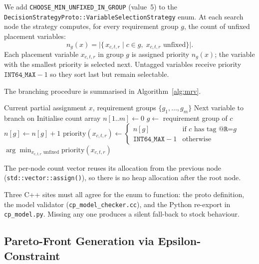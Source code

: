\documentclass[conference]{IEEEtran}
\begin{document}
We add \texttt{CHOOSE\_MIN\_UNFIXED\_IN\_GROUP} (value~5) to the
\texttt{DecisionStrategyProto::VariableSelectionStrategy} enum. At each
search node the strategy computes, for every requirement group $g$, the count
of unfixed placement variables:
\begin{equation}
  n_g(x) = \bigl|\{\,x_{c,t,r} \mid c \in g,\; x_{c,t,r} \text{ unfixed}\}\bigr|.
  \label{eq:mrv_count}
\end{equation}
Each placement variable $x_{c,t,r}$ in group $g$ is assigned priority
$n_g(x)$; the variable with the smallest priority is selected next.
Untagged variables receive priority $\mathtt{INT64\_MAX}{-}1$ so they sort
last but remain selectable.

The branching procedure is summarised in Algorithm~\ref{alg:mrv}.

\begin{algorithm}[htbp]
\caption{\texttt{CHOOSE\_MIN\_UNFIXED\_IN\_GROUP} branching}
\label{alg:mrv}
\begin{algorithmic}[1]
\REQUIRE Current partial assignment $x$, requirement groups
         $\{g_1, \ldots, g_m\}$
\ENSURE  Next variable to branch on
\STATE Initialise count array $n[1..m] \leftarrow 0$
  \STATE $g \leftarrow$ requirement group of $c$
  \STATE $n[g] \leftarrow n[g] + 1$
\ENDFOR
{}
  \STATE $\text{priority}(x_{c,t,r}) \leftarrow
         \begin{cases} n[g] & \text{if } c \text{ has tag } \texttt{@R=}g \\ \mathtt{INT64\_MAX}{-}1 & \text{otherwise} \end{cases}$
\ENDFOR
\RETURN $\arg\min_{x_{c,t,r} \text{ unfixed}} \text{priority}(x_{c,t,r})$
\end{algorithmic}
\end{algorithm}

The per-node count vector reuses its allocation from the previous node
(\texttt{std::vector::assign()}), so there is no heap allocation after the
root node.

Three C++ sites must all agree for the enum to function: the proto definition,
the model validator (\texttt{cp\_model\_checker.cc}), and the Python
re-export in \texttt{cp\_model.py}. Missing any one produces a silent
fall-back to stock behaviour.

\subsection{Pareto-Front Generation via Epsilon-Constraint}\label{sec:pareto}
\end{document}
